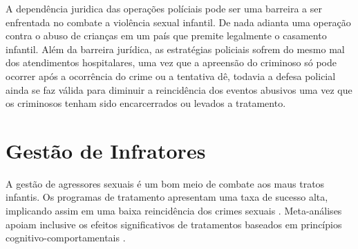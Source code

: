 A dependência juridica das operações políciais pode ser uma barreira a ser enfrentada no combate a violência sexual infantil. De nada adianta uma operação contra o abuso de crianças em um país que premite legalmente o casamento infantil. Além da barreira jurídica, as estratégias policiais sofrem do mesmo mal dos atendimentos hospitalares, uma vez que a apreensão do criminoso só pode ocorrer após a ocorrência do crime ou a tentativa dê, todavia a defesa policial ainda se faz válida para diminuir a reincidência dos eventos abusivos uma vez que os criminosos tenham sido encarcerrados ou levados a tratamento. 


%
%


\section{Gestão de Infratores}\label{sec:infratores}


A gestão de agressores sexuais é um bom meio de combate aos maus tratos infantis. Os programas de tratamento apresentam uma taxa de sucesso alta, implicando assim em uma baixa reincidência dos crimes sexuais \cite{ribeiro2018programas}. Meta-análises apoiam inclusive os efeitos significativos de tratamentos baseados em princípios cognitivo-comportamentais \cite{mendelson2015parent}.

